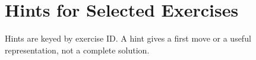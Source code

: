 \chapter{Hints for Selected Exercises}
\label{ch:hints}

Hints are keyed by exercise ID. A hint gives a first move or a useful
representation, not a complete solution.




















